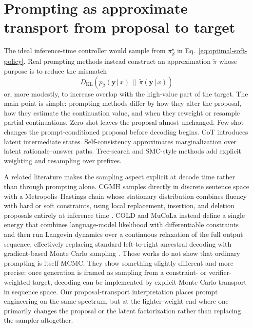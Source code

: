 \documentclass[aps,pre,reprint,superscriptaddress,nofootinbib]{revtex4-2}
\newcommand{\KL}{D_{\mathrm{KL}}}
\newcommand{\given}{\,|\,}
\newcommand{\y}{\mathbf{y}}
\begin{document}
\section{Prompting as approximate transport from proposal to target}

The ideal inference-time controller would sample from $\pi^\star_\beta$ in Eq.~\eqref{eq:optimal-soft-policy}. 
Real prompting methods instead construct an approximation $\tilde{\pi}$ whose purpose is to reduce the mismatch
\begin{equation}
\KL\!\left(p_\beta(\y\given x)\,\|\,\tilde{\pi}(\y\given x)\right)
\label{eq:transport-mismatch}
\end{equation}
or, more modestly, to increase overlap with the high-value part of the target.
The main point is simple: prompting methods differ by how they alter the proposal, how they estimate the continuation value, and when they reweight or resample partial continuations.
Zero-shot leaves the proposal almost unchanged.
Few-shot changes the prompt-conditioned proposal before decoding begins.
CoT introduces latent intermediate states.
Self-consistency approximates marginalization over latent rationale--answer paths.
Tree-search and SMC-style methods add explicit weighting and resampling over prefixes.

A related literature makes the sampling aspect explicit at decode time rather than through prompting alone.
CGMH samples directly in discrete sentence space with a Metropolis--Hastings chain whose stationary distribution combines fluency with hard or soft constraints, using local replacement, insertion, and deletion proposals entirely at inference time \cite{miao2019cgmh}.
COLD and MuCoLa instead define a single energy that combines language-model likelihood with differentiable constraints and then run Langevin dynamics over a continuous relaxation of the full output sequence, effectively replacing standard left-to-right ancestral decoding with gradient-based Monte Carlo sampling \cite{qin2022cold,kumar2022gradient}.
These works do not show that ordinary prompting is itself MCMC.
They show something slightly different and more precise: once generation is framed as sampling from a constraint- or verifier-weighted target, decoding can be implemented by explicit Monte Carlo transport in sequence space.
Our proposal-transport interpretation places prompt engineering on the same spectrum, but at the lighter-weight end where one primarily changes the proposal or the latent factorization rather than replacing the sampler altogether.
\end{document}
